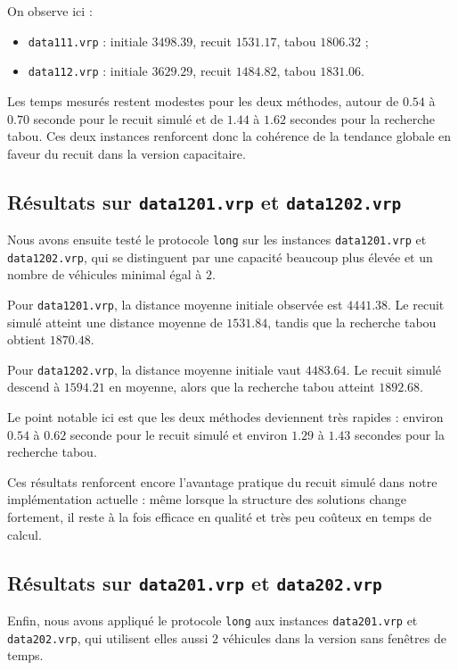 \documentclass[11pt,a4paper]{article}
\begin{document}
On observe ici :
\begin{itemize}
    \item \texttt{data111.vrp} : initiale \(3498.39\), recuit \(1531.17\), tabou \(1806.32\) ;
    \item \texttt{data112.vrp} : initiale \(3629.29\), recuit \(1484.82\), tabou \(1831.06\).
\end{itemize}

Les temps mesurés restent modestes pour les deux méthodes, autour de \(0.54\) à \(0.70\) seconde pour le recuit simulé et de \(1.44\) à \(1.62\) secondes pour la recherche tabou. Ces deux instances renforcent donc la cohérence de la tendance globale en faveur du recuit dans la version capacitaire.

\subsection{Résultats sur \texttt{data1201.vrp} et \texttt{data1202.vrp}}
Nous avons ensuite testé le protocole \texttt{long} sur les instances \texttt{data1201.vrp} et \texttt{data1202.vrp}, qui se distinguent par une capacité beaucoup plus élevée et un nombre de véhicules minimal égal à \(2\).

Pour \texttt{data1201.vrp}, la distance moyenne initiale observée est \(4441.38\). Le recuit simulé atteint une distance moyenne de \(1531.84\), tandis que la recherche tabou obtient \(1870.48\).

Pour \texttt{data1202.vrp}, la distance moyenne initiale vaut \(4483.64\). Le recuit simulé descend à \(1594.21\) en moyenne, alors que la recherche tabou atteint \(1892.68\).

Le point notable ici est que les deux méthodes deviennent très rapides : environ \(0.54\) à \(0.62\) seconde pour le recuit simulé et environ \(1.29\) à \(1.43\) secondes pour la recherche tabou.

Ces résultats renforcent encore l'avantage pratique du recuit simulé dans notre implémentation actuelle : même lorsque la structure des solutions change fortement, il reste à la fois efficace en qualité et très peu coûteux en temps de calcul.

\subsection{Résultats sur \texttt{data201.vrp} et \texttt{data202.vrp}}
Enfin, nous avons appliqué le protocole \texttt{long} aux instances \texttt{data201.vrp} et \texttt{data202.vrp}, qui utilisent elles aussi \(2\) véhicules dans la version sans fenêtres de temps.
\end{document}
